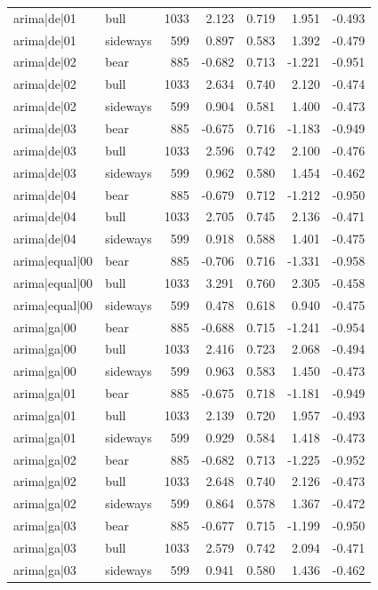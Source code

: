 \begin{table}
\begin{tabular}{llrrrrr}
arima|de|01 & bull & 1033 & 2.123 & 0.719 & 1.951 & -0.493 \\
arima|de|01 & sideways & 599 & 0.897 & 0.583 & 1.392 & -0.479 \\
arima|de|02 & bear & 885 & -0.682 & 0.713 & -1.221 & -0.951 \\
arima|de|02 & bull & 1033 & 2.634 & 0.740 & 2.120 & -0.474 \\
arima|de|02 & sideways & 599 & 0.904 & 0.581 & 1.400 & -0.473 \\
arima|de|03 & bear & 885 & -0.675 & 0.716 & -1.183 & -0.949 \\
arima|de|03 & bull & 1033 & 2.596 & 0.742 & 2.100 & -0.476 \\
arima|de|03 & sideways & 599 & 0.962 & 0.580 & 1.454 & -0.462 \\
arima|de|04 & bear & 885 & -0.679 & 0.712 & -1.212 & -0.950 \\
arima|de|04 & bull & 1033 & 2.705 & 0.745 & 2.136 & -0.471 \\
arima|de|04 & sideways & 599 & 0.918 & 0.588 & 1.401 & -0.475 \\
arima|equal|00 & bear & 885 & -0.706 & 0.716 & -1.331 & -0.958 \\
arima|equal|00 & bull & 1033 & 3.291 & 0.760 & 2.305 & -0.458 \\
arima|equal|00 & sideways & 599 & 0.478 & 0.618 & 0.940 & -0.475 \\
arima|ga|00 & bear & 885 & -0.688 & 0.715 & -1.241 & -0.954 \\
arima|ga|00 & bull & 1033 & 2.416 & 0.723 & 2.068 & -0.494 \\
arima|ga|00 & sideways & 599 & 0.963 & 0.583 & 1.450 & -0.473 \\
arima|ga|01 & bear & 885 & -0.675 & 0.718 & -1.181 & -0.949 \\
arima|ga|01 & bull & 1033 & 2.139 & 0.720 & 1.957 & -0.493 \\
arima|ga|01 & sideways & 599 & 0.929 & 0.584 & 1.418 & -0.473 \\
arima|ga|02 & bear & 885 & -0.682 & 0.713 & -1.225 & -0.952 \\
arima|ga|02 & bull & 1033 & 2.648 & 0.740 & 2.126 & -0.473 \\
arima|ga|02 & sideways & 599 & 0.864 & 0.578 & 1.367 & -0.472 \\
arima|ga|03 & bear & 885 & -0.677 & 0.715 & -1.199 & -0.950 \\
arima|ga|03 & bull & 1033 & 2.579 & 0.742 & 2.094 & -0.471 \\
arima|ga|03 & sideways & 599 & 0.941 & 0.580 & 1.436 & -0.462 \\

\end{tabular}
\end{table}
